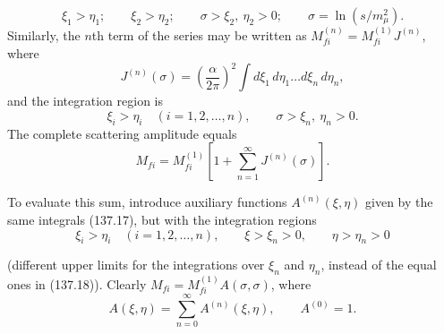 \[
\xi_1>\eta_1;\qquad \xi_2>\eta_2;\qquad
\sigma>\xi_2,\ \eta_2>0;\qquad \sigma=\ln(s/m_\mu^2).
\]
Similarly, the $n$th term of the series may be written as $M_{fi}^{(n)}=M_{fi}^{(1)}J^{(n)}$, where
\begin{equation}
J^{(n)}(\sigma)=\left(\frac{\alpha}{2\pi}\right)^2
\int d\xi_1\,d\eta_1\ldots d\xi_n\,d\eta_n,
\tag{137.17}
\end{equation}
and the integration region is
\begin{equation}
\xi_i>\eta_i\quad(i=1,2,\ldots,n),\qquad
\sigma>\xi_n,\ \eta_n>0.
\tag{137.18}
\end{equation}
The complete scattering amplitude equals
\begin{equation}
M_{fi}=M_{fi}^{(1)}\left[1+\sum_{n=1}^{\infty}J^{(n)}(\sigma)\right].
\tag{137.19}
\end{equation}

To evaluate this sum, introduce auxiliary functions $A^{(n)}(\xi,\eta)$ given by the same integrals (137.17), but with the integration regions
\begin{equation}
\xi_i>\eta_i\quad(i=1,2,\ldots,n),\qquad
\xi>\xi_n>0,\qquad \eta>\eta_n>0
\tag{137.20}
\end{equation}

(different upper limits for the integrations over $\xi_n$ and $\eta_n$, instead of the equal ones in (137.18)). Clearly $M_{fi}=M_{fi}^{(1)}A(\sigma,\sigma)$, where
\begin{equation}
A(\xi,\eta)=\sum_{n=0}^{\infty}A^{(n)}(\xi,\eta),\qquad A^{(0)}=1.
\tag{137.21}
\end{equation}

